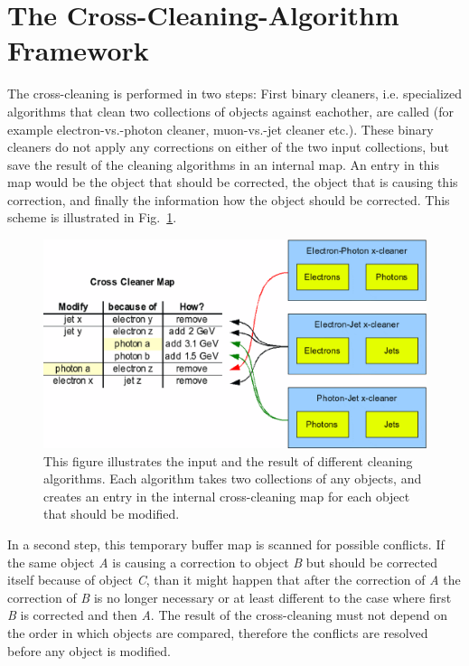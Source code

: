 \documentclass{cmspaper}
\begin{document}
\section{The Cross-Cleaning-Algorithm Framework}
The cross-cleaning is performed in two steps: First binary cleaners, i.e.
specialized algorithms that clean two collections of objects against eachother,
are called (for example electron-vs.-photon cleaner, muon-vs.-jet cleaner etc.).
These binary cleaners do not apply any corrections on either of the two input
collections, but save the result of the cleaning algorithms in an internal map.
An entry in this map would be the object that should be corrected, the object
that is causing this correction, and finally the information how the object
should be corrected. This scheme is illustrated in Fig.~\ref{fig:Cleaning}.

\begin{figure}[hbtp]
  \begin{center}
    \includegraphics[scale=.4]{CleaningMap.eps}
    \caption{This figure illustrates the input and the result of different
    cleaning algorithms. Each algorithm takes two collections of any objects,
    and creates an entry in the internal cross-cleaning map for each object that
    should be modified.}
    \label{fig:Cleaning}
  \end{center}
\end{figure}

In a second step, this temporary buffer map is scanned for possible conflicts.
If the same object {\it A} is causing a correction to object {\it B} but should
be corrected itself because of object {\it C}, than it might happen that after
the correction of {\it A} the correction of {\it B} is no longer necessary or at
least different to the case where first {\it B} is corrected and then {\it A}.
The result of the cross-cleaning must not depend on the order in which objects
are compared, therefore the conflicts are resolved before any object is
modified.
\end{document}
